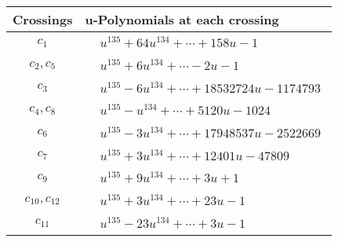 \documentclass[1p]{elsarticle_modified}
\theoremstyle{definition}
\begin{document}
\begin{tabular}{m{50pt}|m{274pt}}
Crossings & \hspace{64pt}u-Polynomials at each crossing \\
\hline $$\begin{aligned}c_{1}\end{aligned}$$&$\begin{aligned}
&u^{135}+64 u^{134}+\cdots+158 u-1
\end{aligned}$\\
\hline $$\begin{aligned}c_{2},c_{5}\end{aligned}$$&$\begin{aligned}
&u^{135}+6 u^{134}+\cdots-2 u-1
\end{aligned}$\\
\hline $$\begin{aligned}c_{3}\end{aligned}$$&$\begin{aligned}
&u^{135}-6 u^{134}+\cdots+18532724 u-1174793
\end{aligned}$\\
\hline $$\begin{aligned}c_{4},c_{8}\end{aligned}$$&$\begin{aligned}
&u^{135}- u^{134}+\cdots+5120 u-1024
\end{aligned}$\\
\hline $$\begin{aligned}c_{6}\end{aligned}$$&$\begin{aligned}
&u^{135}-3 u^{134}+\cdots+17948537 u-2522669
\end{aligned}$\\
\hline $$\begin{aligned}c_{7}\end{aligned}$$&$\begin{aligned}
&u^{135}+3 u^{134}+\cdots+12401 u-47809
\end{aligned}$\\
\hline $$\begin{aligned}c_{9}\end{aligned}$$&$\begin{aligned}
&u^{135}+9 u^{134}+\cdots+3 u+1
\end{aligned}$\\
\hline $$\begin{aligned}c_{10},c_{12}\end{aligned}$$&$\begin{aligned}
&u^{135}+3 u^{134}+\cdots+23 u-1
\end{aligned}$\\
\hline $$\begin{aligned}c_{11}\end{aligned}$$&$\begin{aligned}
&u^{135}-23 u^{134}+\cdots+3 u-1
\end{aligned}$\\
\hline
\end{tabular}\\~\\
\end{document}
